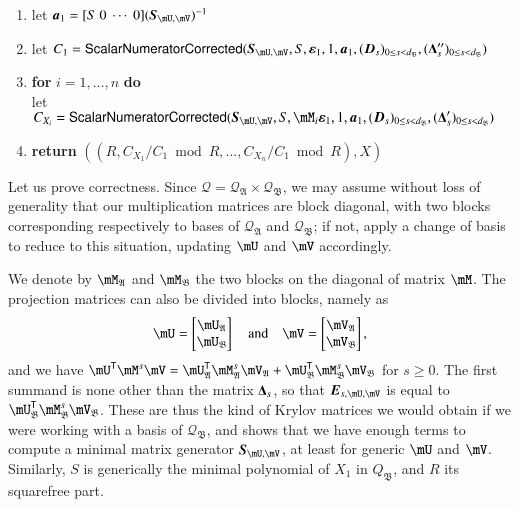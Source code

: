 \documentclass[final,1p,times,authoryear]{elsarticle}
\newcommand{\mat}[1]{\bm{\MakeUppercase{#1}}} %
\newcommand{\row}[1]{\bm{\MakeLowercase{#1}}} %
\newcommand{\col}[1]{\bm{\MakeLowercase{#1}}} %
\newcommand{\lf}{X}
\newcommand{\residueI}{\mathscr{Q}}
\newcommand{\trsp}[1]{#1^{\mathsf{T}}} %
\newcommand{\mUt}{\trsp{\mU}}
\begin{document}
\begin{algorithm}[ht]
\begin{enumerate}
    \item\label{residualstep8} { let $\row{a}_1 = [S~0 ~\cdots~ 0] (\mat{S}_{\mU,\mV})^{-1}$}
    \item\label{residualstep9}  let $C_1 = \mathsf{{\sf ScalarNumeratorCorrected}}(\mat{S}_{\mU,\mV}, S, \col{\varepsilon}_1, 1, \row{a}_1,  (\mat{D}_s)_{0 \le s < d_\mathfrak{B}}, (\mat{\Delta}''_s)_{0 \le s < d_\mathfrak{B}})$
    \item\label{residualstep10} \textbf{for} $i=1,\dots,n$ \textbf{do} \\
      \phantom{for}let $C_{X_i} = \mathsf{{\sf ScalarNumeratorCorrected}}(\mat{S}_{\mU,\mV},S, \mM_i\col{\varepsilon}_1, 1, \row{a}_1, (\mat{D}_s)_{0 \le s < d_\mathfrak{B}}, (\mat{\Delta}'_s)_{0 \le s < d_\mathfrak{B}})$
    \item\label{residualstep11}     \textbf{return} $((R, C_{X_1}/ C_1 \bmod R, \dots, C_{X_n}/ C_{1} \bmod R),\lf)$
  \end{enumerate}  \label{algo:block-sparse-fglm-residual}
\end{algorithm}

Let us prove correctness. Since $\residueI=\residueI_\mathfrak{A}
\times \residueI_\mathfrak{B}$, we may assume without loss of
generality that our multiplication matrices are block diagonal, with
two blocks corresponding respectively to bases of $\residueI_\mathfrak{A}$
and $\residueI_\mathfrak{B}$; if not, apply a change of basis to 
reduce to this situation, updating $\mU$ and $\mV$ accordingly. 

We denote by $\mM_\mathfrak{A}$ and $\mM_\mathfrak{B}$ the 
two blocks on the diagonal of matrix $\mM$.
The projection matrices can also be divided into blocks, namely as
$$\mU = \left [\begin{matrix}\mU_\mathfrak{A} \\\mU_\mathfrak{B}
\end{matrix}\right ] \quad\text{and}\quad
\mV = \left [\begin{matrix}\mV_\mathfrak{A} \\\mV_\mathfrak{B}
\end{matrix}\right ],$$
and we have $\mUt \mM^s \mV = \mUt_\mathfrak{A}
\mM_\mathfrak{A}^s \mV_\mathfrak{A} + \mUt_\mathfrak{B}
\mM_\mathfrak{B}^s \mV_\mathfrak{B}$ for $s \ge 0$. The first summand
is none other than the matrix $\mat{\Delta}_s$, so that
$\mat{E}_{s,\mU,\mV}$ is equal to $\mUt_\mathfrak{B}
\mM_\mathfrak{B}^s \mV_\mathfrak{B}$. These are thus the kind of
Krylov matrices we would obtain if we were working with a basis of
$\residueI_\mathfrak{B}$, and shows that we have enough
terms to compute a minimal matrix generator
$\mat{S}_{\mU,\mV}$, at least for generic $\mU$ and $\mV$. 
Similarly, $S$ is generically the minimal polynomial of $X_1$ in
$Q_\mathfrak{B}$, and $R$ its squarefree part.
\end{document}

